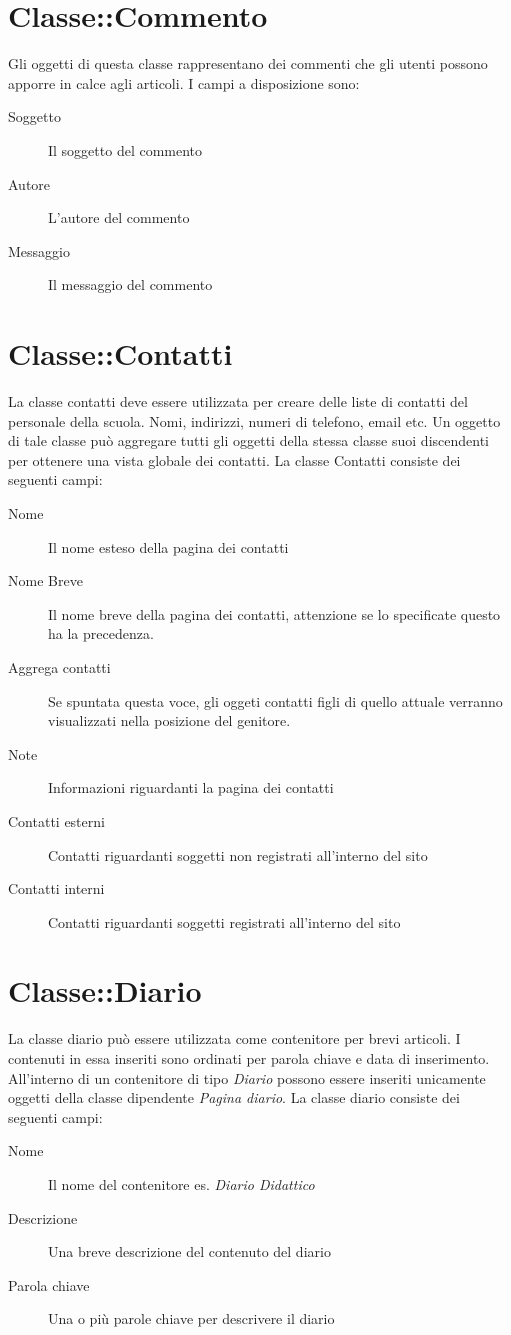 \section{Classe::Commento}
Gli oggetti di questa classe rappresentano dei commenti che gli utenti possono apporre in calce agli articoli. I campi a disposizione sono:
\begin{description}
 \item[Soggetto] Il soggetto del commento
\item[Autore] L'autore del commento
\item[Messaggio]Il messaggio del commento
\end{description}

\section{Classe::Contatti}
La classe contatti deve essere utilizzata per creare delle liste di contatti del personale della scuola. Nomi, indirizzi, numeri di telefono, email etc. Un oggetto di tale classe può aggregare tutti gli oggetti della stessa classe suoi discendenti per ottenere una vista globale dei contatti. La classe Contatti consiste dei seguenti campi:

\begin{description}
 \item[Nome] Il nome esteso della pagina dei contatti
\item[Nome Breve] Il nome breve della pagina dei contatti, attenzione se lo specificate questo ha la precedenza.
\item[Aggrega contatti] Se spuntata questa voce, gli oggeti contatti figli di quello attuale verranno visualizzati nella posizione del genitore.
\item[Note]Informazioni riguardanti la pagina dei contatti
\item[Contatti esterni]Contatti riguardanti soggetti non registrati all'interno del sito
\item[Contatti interni]Contatti riguardanti soggetti registrati all'interno del sito
\end{description}

\section{Classe::Diario}
La classe diario può essere utilizzata come contenitore per brevi articoli. I contenuti in essa inseriti sono ordinati per parola chiave e data di inserimento. All'interno di un contenitore di tipo \textsl{Diario} possono essere inseriti unicamente oggetti della classe dipendente \textsl{Pagina diario}. La classe diario consiste dei seguenti campi:
\begin{description}
 \item[Nome]Il nome del contenitore es. \textsl{Diario Didattico}
\item[Descrizione] Una breve descrizione del contenuto del diario
\item[Parola chiave] Una o più parole chiave per descrivere il diario
\end{description}


